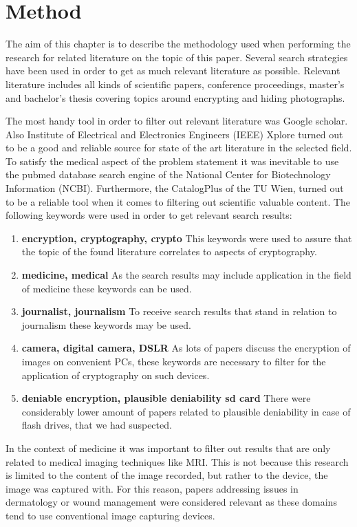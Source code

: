 \documentclass[12pt,a4paper,titlepage,oneside]{scrartcl}
\begin{document}
\newpage
\section{Method}
The aim of this chapter is to describe the methodology used when performing the research for related literature on the topic of this paper.
Several search strategies have been used in order to get as much relevant literature as possible.
Relevant literature includes all kinds of scientific papers, conference proceedings, master's and bachelor's thesis covering topics around encrypting and hiding photographs.

The most handy tool in order to filter out relevant literature was Google scholar. 
Also Institute of Electrical and Electronics Engineers (IEEE) Xplore turned out to be a good and reliable source for state of the art literature in the selected field.
To satisfy the medical aspect of the problem statement it was inevitable to use the pubmed database search engine of the National Center for Biotechnology Information (NCBI).
Furthermore, the CatalogPlus of the TU Wien, turned out to be a reliable tool when it comes to filtering out scientific valuable content.
The following keywords were used in order to get relevant search results:
\begin{enumerate}
  \item  \textbf{encryption, cryptography, crypto}
  This keywords were used to assure that the topic of the found literature correlates to aspects of cryptography.
  \item  \textbf{medicine, medical}
  As the search results may include application in the field of medicine these keywords can be used.
  \item  \textbf{journalist, journalism}
  To receive search results that stand in relation to journalism these keywords may be used.
  \item \textbf{camera, digital camera, DSLR}
  As lots of papers discuss the encryption of images on convenient PCs, these keywords are necessary to filter for the application of cryptography on such devices.
  \item \textbf{deniable encryption, plausible deniability sd card}
    There were considerably lower amount of papers related to plausible deniability in case of flash drives, that we had suspected.
\end{enumerate}

In the context of medicine it was important to filter out results that are only related to medical imaging techniques like MRI.
This is not because this research is limited to the content of the image recorded, but rather to the device, the image was captured with.
For this reason, papers addressing issues in dermatology or wound management were considered relevant as these domains tend to use conventional image capturing devices.
\end{document}
